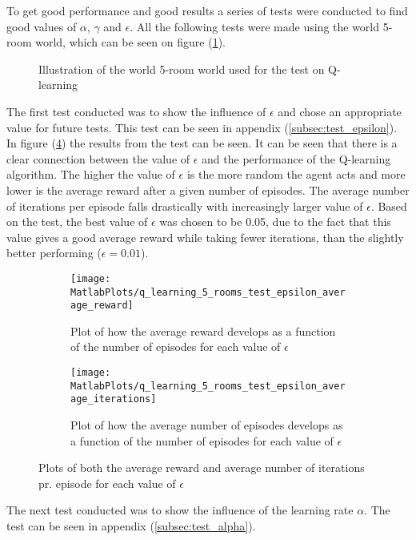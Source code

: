 \documentclass[../Head/Main.tex]{subfiles}
\begin{document}
To get good performance and good results a series of tests were conducted to find good values of $\alpha$, $\gamma$ and $\epsilon$. All the following tests were made using the world 5-room world, which can be seen on figure (\ref{fig:5-room_world_impl}).
\begin{figure}[H]
	\centering
	
	\caption{Illustration of the world 5-room world used for the test on Q-learning}
	\label{fig:5-room_world_impl}
\end{figure}
The first test conducted was to show the influence of $\epsilon$ and chose an appropriate value for future tests. This test can be seen in appendix (\ref{subsec:test_epsilon}).\\
In figure (\ref{fig:q-learn_epsilon_impl}) the results from the test can be seen. It can be seen that there is a clear connection between the value of $\epsilon$ and the performance of the Q-learning algorithm. The higher the value of $\epsilon$ is the more random the agent acts and more lower is the average reward after a given number of episodes. The average number of iterations per episode falls drastically with increasingly larger value of $\epsilon$. Based on the test, the best value of $\epsilon$ was chosen to be 0.05, due to the fact that this value gives a good average reward while taking fewer iterations, than the slightly better performing ($\epsilon=0.01$). 
\begin{figure}[H]
	\centering
	\begin{subfigure}[b]{0.49\textwidth}
		\centering
		\texttt{[image: MatlabPlots/q\_learning\_5\_rooms\_test\_epsilon\_average\_reward]}
		\caption{Plot of how the average reward develops as a function of the number of episodes for each value of $\epsilon$}
		\label{fig:q-learn_epsilon_reward_impl}
	\end{subfigure}
	\hfill
	\begin{subfigure}[b]{0.49\textwidth}
		\centering
		\texttt{[image: MatlabPlots/q\_learning\_5\_rooms\_test\_epsilon\_average\_iterations]}
		\caption{Plot of how the average number of episodes develops as a function of the number of episodes for each value of $\epsilon$}
		\label{fig:q-learn_epsilon_iterations_impl}
	\end{subfigure}
	\caption{Plots of both the average reward and average number of iterations pr. episode for each value of $\epsilon$}
	\label{fig:q-learn_epsilon_impl}
\end{figure}
The next test conducted was to show the influence of the learning rate $\alpha$. The test can be seen in appendix (\ref{subsec:test_alpha}).\\
\end{document}
